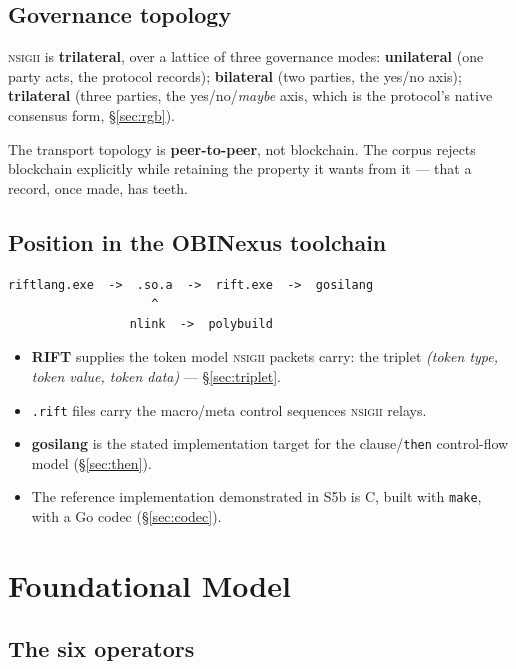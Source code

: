 \documentclass[11pt,a4paper]{article}
\newcommand{\NSIGII}{\textsc{nsigii}}
\begin{document}
\subsection{Governance topology}

\NSIGII{} is \textbf{trilateral}, over a lattice of three governance modes:
\textbf{unilateral} (one party acts, the protocol records); \textbf{bilateral}
(two parties, the yes/no axis); \textbf{trilateral} (three parties, the
yes/no/\emph{maybe} axis, which is the protocol's native consensus form,
\S\ref{sec:rgb}).

The transport topology is \textbf{peer-to-peer}, not blockchain. The corpus
rejects blockchain explicitly while retaining the property it wants from it ---
that a record, once made, has teeth.

\subsection{Position in the OBINexus toolchain}

\begin{Verbatim}[fontsize=\small,frame=single]
riftlang.exe  ->  .so.a  ->  rift.exe  ->  gosilang
                    ^
                 nlink  ->  polybuild
\end{Verbatim}

\begin{itemize}[leftmargin=*]
  \item \textbf{RIFT} supplies the token model \NSIGII{} packets carry: the
    triplet \emph{(token type, token value, token data)} ---
    \S\ref{sec:triplet}.
  \item \texttt{.rift} files carry the macro/meta control sequences \NSIGII{}
    relays.
  \item \textbf{gosilang} is the stated implementation target for the
    clause/\texttt{then} control-flow model (\S\ref{sec:then}).
  \item The reference implementation demonstrated in S5b is C, built with
    \texttt{make}, with a Go codec (\S\ref{sec:codec}).
\end{itemize}

\section{Foundational Model}

\subsection{The six operators}
\label{sec:ops}
\end{document}
